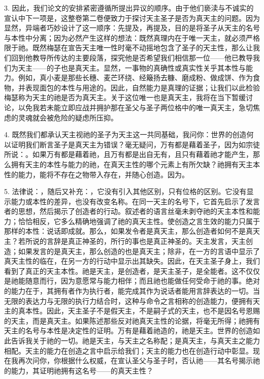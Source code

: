 3. 因此，我们论文的安排紧密遵循所提出异议的顺序。由于他们亵渎与不诚实的宣认中下一项是，这整卷第二卷便致力于探讨天主圣子是否为真天主的问题。因为显然，异端者巧妙设计了这一顺序：先提及，再提及，目的是将圣子从天主的名号与本性中分离；因为必然产生这样的想法：既然真理内在于唯一天主，就必须严格限于祂。既然梅瑟在宣告天主唯一性时毫不动摇地包含了圣子的天主性，那么让我们回到他教导所传达的主要段落，探究他是否希望我们相信那一位——他已教导我们为天主——的子也是真天主。显然，一事物的真确性或真实性关乎其本性与能力。例如，真小麦是那些长穗、麦芒环绕、经簸扬去糠、磨成粉、做成饼、作为食物，并表现面包的本性与用途的。因此，自然能力是真理的证据；让我们以此检验梅瑟称为天主的祂是否为真天主。关于这位唯一也是真天主，我将在当下暂缓讨论，以免我若未能立即应战并拥护那在圣父与圣子两位格中的唯一真天主，急切焦虑的灵魂就会被危险的疑虑所压抑。\par

4. 既然我们都承认天主视祂的圣子为天主这一共同基础，我问你：世界的创造何以证明我们断言圣子是真天主为错误？毫无疑问，万有都是藉着圣子，因为如宗徒所说：。如果万有都是藉着祂，且万有都是出自无有，且只有藉着祂才能产生，那么拥有天主的本性与能力的祂，在真天主性的哪个元素上有所欠缺？祂拥有天主本性的能力，能将不存在之物带入存在，并随心创造。因为。\par

5. 法律说：，随后又补充：，它没有引入其他区别，只有位格的区别。它没有显示能力或本性的差异，也没有改变名称。在同一天主的名号下，它首先启示了发言者的思想，然后揭示了创造者的行动。叙述者的语言丝毫未剥夺祂的天主本性和能力；恰恰相反，它多么精确地强调了祂的真天主性。使创造之言生效的能力只属于那样的本性：说话即成就。那么，如果发令者是真天主，那么创造者如何不是真天主？若所说的言辞是真正神圣的，所行的事也是真正神圣的。天主发言，天主创造；如果发言的是真天主，那么创造的也是真天主；除非，在一方的言语中显示了真天主性的临在，在另一方的行动中显示出其缺失。因此，在天主圣子身上，我们看到了真正的天主本性。祂是天主，是创造者，是天主圣子，是全能者。这不仅仅是祂能随意而行，因为意愿常与能力相伴；而且祂也能做任何受命于祂的事。绝对的能力在于，其拥有者作为执行者，能完成其作为说话者能用言辞表达的一切。当无限的表达力与无限的执行力结合时，这种与命令之言相称的创造能力，便拥有天主的真本性。因此，天主圣子不是假天主，不是嗣子式的天主，也不是因名号恩赐的天主，而是真天主。如果陈述那些反对祂真天主性的论据，将毫无所得；祂拥有天主的名号与本性是决定性的证明。万有是藉着祂造的，祂是天主。世界的创造如此告诉我关于祂的一切。祂是天主，与天主之名称配；是真天主，与真天主之能力相配。天主的能力在创造之言中启示给我们；天主的能力也在创造行动中彰显。现在我再次问你，你根据什么权威，在宣认圣父与圣子时，否认祂——其名号揭示祂的能力，其证明祂拥有这名号——的真天主性？\par

